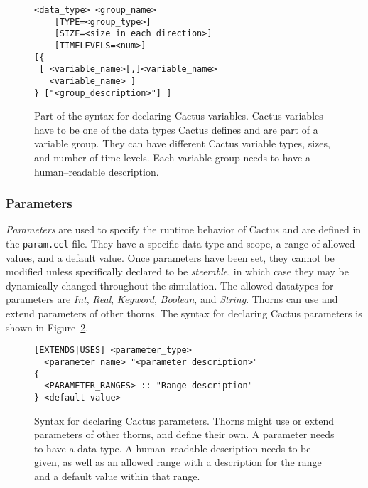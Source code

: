 \documentclass[conference]{IEEEtran}
\begin{document}
\begin{figure}[h]
\centering
{\small
\begin{Verbatim}[frame=single, framerule=0.3mm]
<data_type> <group_name> 
    [TYPE=<group_type>] 
    [SIZE=<size in each direction>] 
    [TIMELEVELS=<num>]
[{ 
 [ <variable_name>[,]<variable_name>
   <variable_name> ] 
} ["<group_description>"] ]
\end{Verbatim}
}
\caption{Part of the syntax for declaring Cactus variables. Cactus variables have to be one
of the data types Cactus defines and are part of a variable group. They can have different
Cactus variable types, sizes, and number of time levels.
Each variable group needs to have a human--readable description.}
\label{cactusvar}
\end{figure}

\subsubsection{Parameters}
\emph{Parameters} are used to specify the runtime behavior of Cactus and are defined in the
\texttt{param.ccl} file. They have a specific data type and scope, a range of allowed values, and a default value.
Once parameters have been set, they cannot be modified unless specifically declared to be 
\emph{steerable}, in which case they may be dynamically changed throughout the simulation. 
The allowed datatypes for parameters are \emph{Int}, \emph{Real}, \emph{Keyword}, \emph{Boolean}, and \emph{String}. Thorns can use and extend parameters of other thorns.
The syntax for declaring Cactus parameters is shown in Figure~\ref{cactuspar}.

\begin{figure}[h]
\centering
{\small
\begin{Verbatim}[frame=single, framerule=0.3mm]
[EXTENDS|USES] <parameter_type>
  <parameter name> "<parameter description>" 
{
  <PARAMETER_RANGES> :: "Range description"
} <default value>
\end{Verbatim}
}
\caption{Syntax for declaring Cactus parameters. Thorns might use or extend parameters of
other thorns, and define their own. A parameter needs to have a data type. A human--readable description needs to be given, as well as an allowed range
with a description for the range and a default value within that range.}
\label{cactuspar}
\end{figure}
\end{document}
